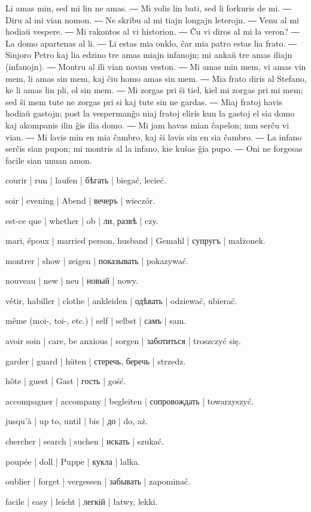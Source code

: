 
Li amas min, sed mi lin ne amas. ― Mi volis lin bati, sed li forkuris de mi. ― Diru al mi vian nomon. ― Ne skribu al mi tiajn longajn leterojn. ― Venu al mi hodiaŭ vespere. ― Mi rakontos al vi historion. ― Ĉu vi diros al mi la veron? ― La domo apartenas al li. ― Li estas mia onklo, ĉar mia patro estas lia frato. ― Sinjoro Petro kaj lia edzino tre amas miajn infanojn; mi ankaŭ tre amas iliajn (infanojn). ― Montru al ili vian novan veston. ― Mi amas min mem, vi amas vin mem, li amas sin mem, kaj ĉiu homo amas sin mem. ― Mia frato diris al Stefano, ke li amas lin pli, ol sin mem. ― Mi zorgas pri ŝi tiel, kiel mi zorgas pri mi mem; sed ŝi mem tute ne zorgas pri si kaj tute sin ne gardas. ― Miaj fratoj havis hodiaŭ gastojn; post la vespermanĝo niaj fratoj eliris kun la gastoj el sia domo kaj akompanis ilin ĝis ilia domo. ― Mi jam havas mian ĉapelon; nun serĉu vi vian. ― Mi lavis min en mia ĉambro, kaj ŝi lavis sin en sia ĉambro. ― La infano serĉis sian pupon; mi montris al la infano, kie kuŝas ĝia pupo. ― Oni ne forgesas facile sian unuan amon.

\begin{ekzvocab}{1em}
 courir | run | laufen | бѣгать | biegać, lecieć.

 soir | evening | Abend | вечеръ | wieczór.

 est-ce que | whether | ob | ли, развѣ | czy.

 mari, époux | married person, husband | Gemahl | супругъ | małżonek.

 montrer | show | zeigen | показывать | pokazywać.

 nouveau | new | neu | новый | nowy.

 vêtir, habiller | clothe | ankleiden | одѣвать | odziewać, ubierać.

 même (moi-, toi-, etc.) | self | selbst | самъ | sam.

 avoir soin | care, be anxious | sorgen | заботиться | troszczyć się.

 garder | guard | hüten | стеречь, беречь | strzedz.

 hôte | guest | Gast | гость | gość.

 accompagner | accompany | begleiten | сопровождать | towarzyszyć.

 jusqu’à | up to, until | bis | до | do, aż.

 chercher | search | suchen | искать | szukać.

 poupée | doll | Puppe | кукла | lalka.

 oublier | forget | vergessen | забывать | zapominać.

 facile | easy | leicht | легкій | łatwy, lekki.

\end{ekzvocab}

